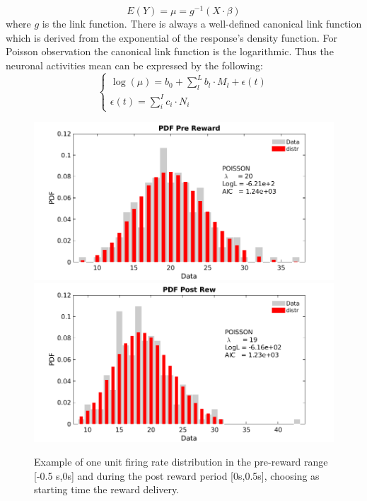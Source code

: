 \begin{equation}
E(Y)=\mu=g^{-1}(X\cdot \beta)
\label{eq:GLM}
\end{equation}
where $g$ is the link function. There is always a well-defined canonical link function which is derived from the exponential of the response's density function. For Poisson observation the canonical link function is the logarithmic. Thus the neuronal activities mean can be expressed by the following:
\begin{equation}
\begin{cases}
\log(\mu)=b_0+\sum\limits_l^L b_l\cdot M_l+\epsilon(t)\\
\epsilon(t)=\sum\limits_i^I c_i\cdot N_i 
\end{cases}
\label{eq:PoisLinRe}
\end{equation}
\begin{figure}
    \centering
    \includegraphics[scale=0.25]{figures/PreRewDistr_An1neu6_FSI.png}
    \includegraphics[scale=0.25]{figures/PostRewDistr_An1neu6_FSI_.png}
    \caption{Example of one unit firing rate distribution in the pre-reward range [-0.5 s,0s] and during the post reward period [0s,0.5s], choosing as starting time the reward delivery.}
    \label{fig:DistributionEx}\end{figure}

